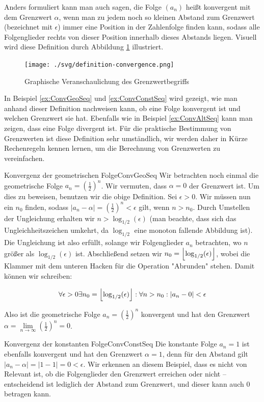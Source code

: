 Anders formuliert kann man auch sagen, die Folge $(a_n)$ heißt konvergent mit dem Grenzwert $\alpha$, wenn man zu jedem noch so kleinen Abstand zum Grenzwert (bezeichnet mit $\epsilon$) immer eine Position in der Zahlenfolge finden kann, sodass alle Folgenglieder rechts von dieser Position innerhalb dieses Abstands liegen. Visuell wird diese Definition durch Abbildung \ref{fig:VisLimit} illustriert.

\begin{figure}
	\centering
	\texttt{[image: ./svg/definition-convergence.png]}
	\caption{Graphische Veranschaulichung des Grenzwertbegriffs}
	\label{fig:VisLimit}
\end{figure}

In Beispiel \ref{ex:ConvGeoSeq} und \ref{ex:ConvConstSeq} wird gezeigt, wie man anhand dieser Definition nachweisen kann, ob eine Folge konvergent ist und welchen Grenzwert sie hat. Ebenfalls wie in Beispiel \ref{ex:ConvAltSeq} kann man zeigen, dass eine Folge divergent ist. Für die praktische Bestimmung von Grenzwerten ist diese Definition sehr umständlich, wir werden daher in Kürze Rechenregeln kennen lernen, um die Berechnung von Grenzwerten zu vereinfachen.

\begin{example}{Konvergenz der geometrischen Folge}{ConvGeoSeq}
	Wir betrachten noch einmal die geometrische Folge $a_n = (\frac{1}{2})^n$. Wir vermuten, dass $\alpha=0$ der Grenzwert ist. Um dies zu beweisen, benutzen wir die obige Definition. Sei $\epsilon>0$. Wir müssen
	nun ein $n_0$ finden, sodass $|a_n-\alpha|=(\frac{1}{2})^n < \epsilon$ gilt, wenn $n > n_0$. Durch Umstellen der Ungleichung erhalten wir $n > \log_{1/2}(\epsilon)$ (man beachte, dass sich das Ungleichheitszeichen umkehrt, da $\log_{1/2}$ eine monoton fallende Abbildung ist). Die Ungleichung ist also erfüllt, solange wir Folgenglieder $a_n$ betrachten, wo $n$ größer als $\log_{1/2}(\epsilon)$ ist. Abschließend setzen wir $n_0 = \left\lfloor \log_{1/2}(\epsilon) \right\rfloor$, wobei die Klammer mit dem unteren Hacken für die Operation "Abrunden" stehen. Damit können wir schreiben:

	$$
	\forall \epsilon > 0 \exists n_0 = \left\lfloor \log_{1/2}(\epsilon) \right\rfloor : \forall n > n_0 : |a_n - 0| < \epsilon
	$$

	Also ist die geometrische Folge $a_n = (\frac{1}{2})^n$ konvergent und hat den Grenzwert $\alpha=\lim\limits_{n\to\infty}(\frac{1}{2})^n=0$.
\end{example}


\begin{example}{Konvergenz der konstanten Folge}{ConvConstSeq}
	Die konstante Folge $a_n = 1$ ist ebenfalls konvergent und hat den Grenzwert $\alpha = 1$, denn für den Abstand gilt $|a_n-\alpha|=|1-1|=0<\epsilon$. Wir erkennen an diesem Beispiel, dass es nicht von Relevant ist, ob die Folgenglieder den Grenzwert erreichen oder nicht -- entscheidend ist lediglich der Abstand zum Grenzwert, und dieser kann auch $0$ betragen kann.
\end{example}


